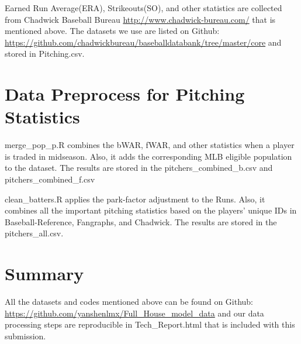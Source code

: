 \documentclass{article}
\begin{document}
Earned Run Average(ERA), Strikeouts(SO), and other statistics are collected from Chadwick Baseball Bureau \url{http://www.chadwick-bureau.com/} that is mentioned above. The datasets we use are listed on Github: \url{https://github.com/chadwickbureau/baseballdatabank/tree/master/core} and stored in Pitching.csv.

\section{Data Preprocess for Pitching Statistics}


merge\_pop\_p.R combines the bWAR, fWAR, and other statistics when a player is traded in midseason. Also, it adds the corresponding MLB eligible population to the dataset. The results are stored in the pitchers\_combined\_b.csv and pitchers\_combined\_f.csv

\bigskip

clean\_batters.R applies the park-factor adjustment to the Runs. Also, it combines all the important pitching statistics based on the players' unique IDs in Baseball-Reference, Fangraphs, and Chadwick. The results are stored in the pitchers\_all.csv. 

\section{Summary}

All the datasets and codes mentioned above can be found on Github: \url{https://github.com/yanshenlmx/Full_House_model_data} and our data processing steps are reproducible in Tech\_Report.html that is included with this submission.

\end{document}
